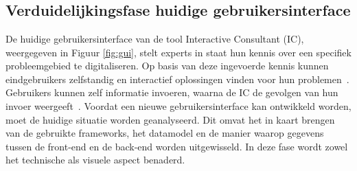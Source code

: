 
\chapter{}%
\label{ch:methodologie}


\section [Verduidelijkingsfase huidige situatie]{Verduidelijkingsfase huidige geb\-ruikersinterface}
De huidige gebruikersinterface van de tool Interactive Consultant (IC), weergegeven in Figuur \ref{fig:gui}, stelt experts in staat hun kennis over een specifiek probleemgebied te digitaliseren. Op basis van deze ingevoerde kennis kunnen eindgebruikers zelfstandig en interactief oplossingen vinden voor hun problemen~\autocite{Carbonnelle2024}. Gebruikers kunnen zelf informatie invoeren, waarna de IC de gevolgen van hun invoer weergeeft~\autocite{DeVogelaere2025}. Voordat een nieuwe gebruikersinterface kan ontwikkeld worden, moet de huidige situatie worden geanalyseerd. Dit omvat het in kaart brengen van de gebruikte frameworks, het datamodel en de manier waarop gegevens tussen de front-end en de back-end worden uitgewisseld. In deze fase wordt zowel het technische als visuele aspect benaderd.

